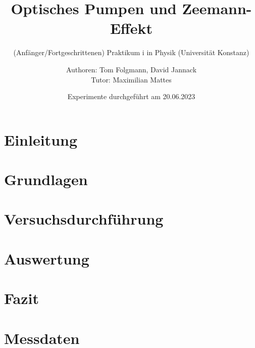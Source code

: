 \documentclass[
    a4paper,
    twoside=true,
    footinclude=off, 
    captions=tableheading, 
    DIV=12;usenames,
    dvipsnames
]{scrartcl}
\begin{document}
    \title{Optisches Pumpen und Zeemann-Effekt}
    \subtitle{(Anfänger/Fortgeschrittenen) Praktikum i in Physik (Universität Konstanz)}
    \author{Authoren: Tom Folgmann, David Jannack \\ \large{Tutor: Maximilian Mattes}}
    \date{Experimente durchgeführt am 20.06.2023}
    \maketitle
    \thispagestyle{empty}
    \section*{Einleitung}
        

    \newpage


    \tableofcontents
    \thispagestyle{empty}	
    \newpage
    \setcounter{page}{1}


\newpage
\section{Grundlagen}
    
    
	

\newpage
\section{Versuchsdurchführung}
    

\newpage
\section{Auswertung}
    

\newpage
\section{Fazit}
    


\newpage
    
\newpage
    \listoffigures
    \listoftables


\newpage
    \section*{Messdaten}
    
\newpage
    



%
\end{document}
